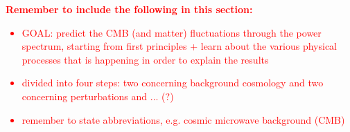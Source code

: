 
\textcolor{red}{
\textbf{Remember to include the following in this section:}
\begin{itemize}
    \item GOAL: predict the CMB (and matter) fluctuations through the power spectrum, starting from first principles + learn about the various physical processes that is happening in order to explain the results
    \item divided into four steps: two concerning background cosmology and two concerning perturbations and ... (?)
    \item remember to state abbreviations, e.g. cosmic microwave background (CMB) 
\end{itemize}}